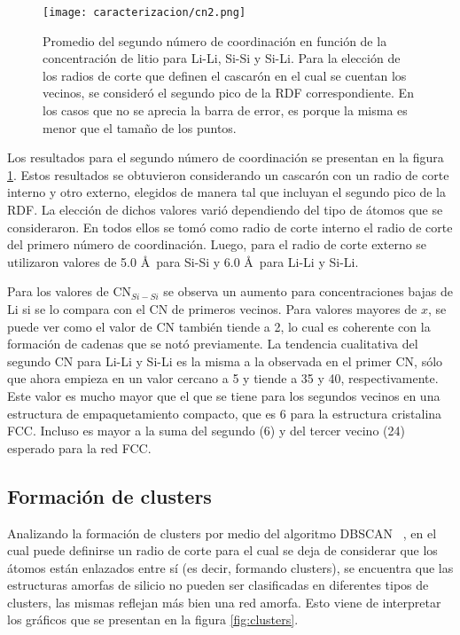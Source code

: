 \begin{figure}[th]
    \centering
    \texttt{[image: caracterizacion/cn2.png]}
    \caption{Promedio del segundo número de coordinación en función de la 
    concentración de litio para Li-Li, Si-Si y Si-Li. Para la elección de los 
    radios de corte que definen el cascarón en el cual se cuentan los vecinos,
    se consideró el segundo pico de la RDF correspondiente. En los casos que no 
    se aprecia la barra de error, es porque la misma es menor que el tamaño de 
    los puntos.}
    \label{fig:cn2}
\end{figure}
Los resultados para el segundo número de coordinación se presentan en la figura 
\ref{fig:cn2}. Estos resultados se obtuvieron considerando un cascarón con un 
radio de corte interno y otro externo, elegidos de manera tal que incluyan el 
segundo pico de la RDF. La elección de dichos valores varió dependiendo del tipo
de átomos que se consideraron. En todos ellos se tomó como radio de corte interno 
el radio de corte del primero número de coordinación. Luego, para el radio de 
corte externo se utilizaron valores de 5.0 \AA\ para Si-Si y 6.0 \AA\ para Li-Li
y Si-Li.

Para los valores de CN$_{Si-Si}$ se observa un aumento para concentraciones bajas
de Li si se lo compara con el CN de primeros vecinos. Para valores mayores de $x$,
se puede ver como el valor de CN también tiende a 2, lo cual es coherente con la
formación de cadenas que se notó previamente. La tendencia cualitativa del segundo
CN para Li-Li y Si-Li es la misma a la observada en el primer CN, sólo que ahora
empieza en un valor cercano a 5 y tiende a 35 y 40, respectivamente. Este valor 
es mucho mayor que el que se tiene para los segundos vecinos en una estructura 
de empaquetamiento compacto, que es 6 para la estructura cristalina FCC. Incluso 
es mayor a la suma del segundo (6) y del tercer vecino (24) esperado para la red 
FCC.

\subsection{Formación de clusters}\label{s:clusters}

Analizando la formación de clusters por medio del algoritmo DBSCAN 
~\cite{ester1996}, en el cual puede definirse un radio de corte para el cual se 
deja de considerar que los átomos están enlazados entre sí (es decir, formando 
clusters), se encuentra que las estructuras amorfas de silicio no pueden ser 
clasificadas en diferentes tipos de clusters, las mismas reflejan más bien 
una red amorfa. Esto viene de interpretar los gráficos que se presentan en la 
figura \ref{fig:clusters}. 

